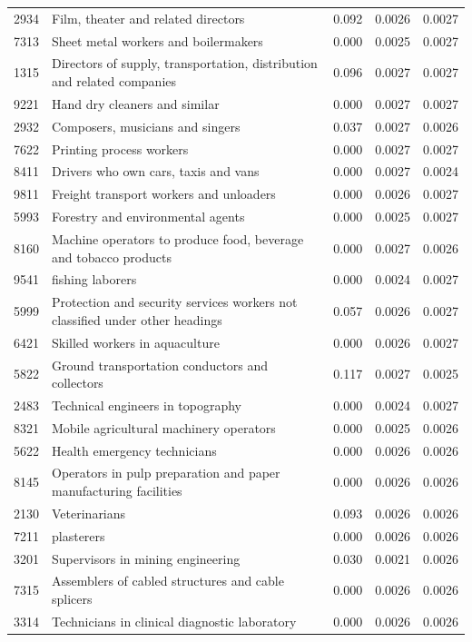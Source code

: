 \begin{longtable}{p{}>{\raggedright\arraybackslash}p{}rrr}
2934 & Film, theater and related directors & 0.092 & 0.0026 & 0.0027 \\
7313 & Sheet metal workers and boilermakers & 0.000 & 0.0025 & 0.0027 \\
1315 & Directors of supply, transportation, distribution and related companies & 0.096 & 0.0027 & 0.0027 \\
9221 & Hand dry cleaners and similar & 0.000 & 0.0027 & 0.0027 \\
2932 & Composers, musicians and singers & 0.037 & 0.0027 & 0.0026 \\
7622 & Printing process workers & 0.000 & 0.0027 & 0.0027 \\
8411 & Drivers who own cars, taxis and vans & 0.000 & 0.0027 & 0.0024 \\
9811 & Freight transport workers and unloaders & 0.000 & 0.0026 & 0.0027 \\
5993 & Forestry and environmental agents & 0.000 & 0.0025 & 0.0027 \\
8160 & Machine operators to produce food, beverage and tobacco products & 0.000 & 0.0027 & 0.0026 \\
9541 & fishing laborers & 0.000 & 0.0024 & 0.0027 \\
5999 & Protection and security services workers not classified under other headings & 0.057 & 0.0026 & 0.0027 \\
6421 & Skilled workers in aquaculture & 0.000 & 0.0026 & 0.0027 \\
5822 & Ground transportation conductors and collectors & 0.117 & 0.0027 & 0.0025 \\
2483 & Technical engineers in topography & 0.000 & 0.0024 & 0.0027 \\
8321 & Mobile agricultural machinery operators & 0.000 & 0.0025 & 0.0026 \\
5622 & Health emergency technicians & 0.000 & 0.0026 & 0.0026 \\
8145 & Operators in pulp preparation and paper manufacturing facilities & 0.000 & 0.0026 & 0.0026 \\
2130 & Veterinarians & 0.093 & 0.0026 & 0.0026 \\
7211 & plasterers & 0.000 & 0.0026 & 0.0026 \\
3201 & Supervisors in mining engineering & 0.030 & 0.0021 & 0.0026 \\
7315 & Assemblers of cabled structures and cable splicers & 0.000 & 0.0026 & 0.0026 \\
3314 & Technicians in clinical diagnostic laboratory & 0.000 & 0.0026 & 0.0026 \\

\end{longtable}
